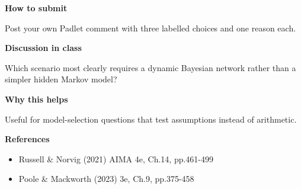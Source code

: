\documentclass[11pt]{article}
\begin{document}
\begin{tcolorbox}[colback=white,colframe=MidnightBlue,title={Q3 Structured Problem},fonttitle=\bfseries,breakable]
{\large\bfseries\color{MidnightBlue} How to submit}\par\medskip
Post your own Padlet comment with three labelled choices and one reason each.

{\large\bfseries\color{MidnightBlue} Discussion in class}\par\medskip
Which scenario most clearly requires a dynamic Bayesian network rather than a simpler hidden Markov model?

{\large\bfseries\color{MidnightBlue} Why this helps}\par\medskip
Useful for model-selection questions that test assumptions instead of arithmetic.

{\large\bfseries\color{MidnightBlue} References}\par\medskip
\begin{itemize}\item Russell \& Norvig (2021) AIMA 4e, Ch.14, pp.461-499
\item Poole \& Mackworth (2023) 3e, Ch.9, pp.375-458\end{itemize}
\end{tcolorbox}
\end{document}

